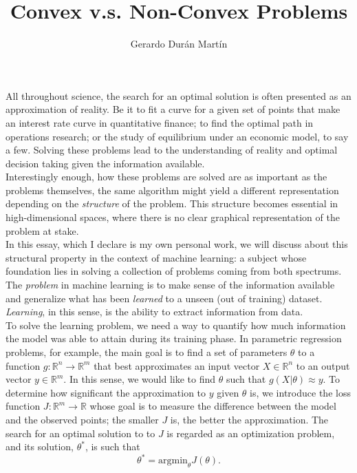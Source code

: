 \documentclass{article}
\title{Convex v.s. Non-Convex Problems}
\author{Gerardo Durán Martín}
\newcommand{\rnums}{\mathbb{R}}
\begin{document}
	\maketitle
	
	All throughout science, the search for an optimal solution is often presented as an approximation of reality. Be it to fit a curve for a given set of points that make an interest rate curve in quantitative finance; to find the optimal path in operations research; or the study of equilibrium under an economic model, to say a few. Solving these problems lead to the understanding of reality and optimal decision taking given the information available.\\
	
	Interestingly enough, how these problems are solved are as important as the problems themselves, the same algorithm might yield a different representation depending on the \textit{structure} of the problem. This structure becomes essential in high-dimensional spaces, where there is no clear graphical representation of the problem at stake.\\
	
	In this essay, which I declare is my own personal work, we will discuss about this structural property in the context of machine learning: a subject whose foundation lies in solving a collection of problems coming from both spectrums.\\
	
	 The \textit{problem} in machine learning is to make sense of the information available and generalize what has been \textit{learned} to a unseen (out of training) dataset. \textit{Learning}, in this sense, is the ability to extract information from data.\\
	
	To solve the learning problem, we need a way to quantify how much information the model was able to attain during its training phase. In parametric regression problems, for example, the main goal is to find a set of parameters $\theta$ to a function $g:\rnums^n\to\rnums^m$ that best approximates an input vector $X\in\rnums^n$ to an output vector $y\in\rnums^m$. In this sense, we would like to find $\theta$ such that $g(X|\theta) \approx y$. To determine how significant the approximation to $y$ given $\theta$ is, we introduce the loss function $J: \rnums^m \to \rnums$ whose goal is to measure the difference between the model and the observed points; the smaller $J$ is, the better the approximation. The search for an optimal solution to to $J$ is regarded as an optimization problem, and its solution, $\theta^*$, is such that	
	\begin{equation}\label{eq:opt_solution}
		\theta^* = \text{argmin}_\theta  J(\theta).
	\end{equation}
	
\end{document}
